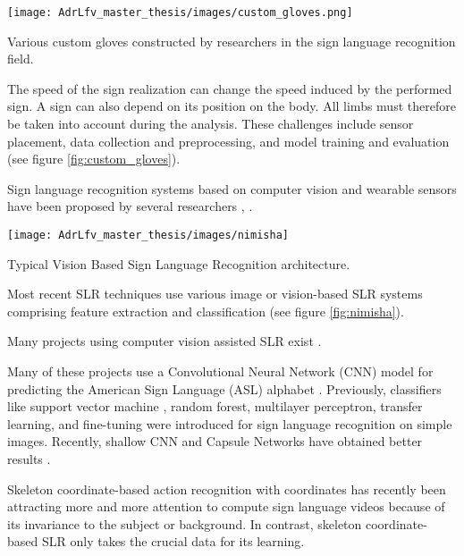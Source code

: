 \begin{marginfigure}
    \centering
    
    \texttt{[image: AdrLfv\_master\_thesis/images/custom\_gloves.png]}
    \caption{Various custom gloves constructed by researchers in the sign language recognition field.}
    \label{fig:custom_gloves}
\end{marginfigure}

The speed of the sign realization can change the speed induced by the performed sign. A sign can also depend on its position on the body. All limbs must therefore be taken into account during the analysis. These challenges include sensor placement, data collection and preprocessing, and model training and evaluation \cite{9178440} (see figure \ref{fig:custom_gloves}).

Sign language recognition systems based on computer vision and wearable sensors have been proposed by several researchers \cite{ionescu2005dynamic} \cite{yu2010vision} \cite{li2015feature} \cite{sonkusare2015review} \cite{bobic2016hand} \cite{islam2017real} \cite{islam2017real} \cite{saha2018machine}, \cite{rastgoo2021hand} \cite{xu2021application}. 

\begin{marginfigure}
    \centering
    \texttt{[image: AdrLfv\_master\_thesis/images/nimisha]}
    \caption{Typical Vision Based Sign Language Recognition architecture.}
    \label{fig:nimisha}
\end{marginfigure}

Most recent SLR techniques use various image or vision-based SLR systems comprising feature extraction and classification \cite{nimisha2020brief} (see figure \ref{fig:nimisha}). 

Many projects using computer vision assisted SLR exist \cite{admasu2010ethiopian} \cite{deriche2019intelligent} \cite{ahram2021advances} \cite{song2021intelligent} \cite{lee2021american} \cite{lee2021comparative} \cite{gao2021rnn}. 

Many of these projects use a Convolutional Neural Network (CNN) model for predicting the American Sign Language (ASL) alphabet \cite{bin2019study}. Previously, classifiers like support vector machine \cite{savur2015real}, random forest, multilayer perceptron, transfer learning, and fine-tuning \cite{saleh2020arabic} were introduced for sign language recognition on simple images. Recently, shallow CNN and Capsule Networks have obtained better results \cite{hasan2020classification}. 

Skeleton coordinate-based action recognition with coordinates has recently been attracting more and more attention to compute sign language videos because of its invariance to the subject or background. In contrast, skeleton coordinate-based SLR only takes the crucial data for its learning. 

